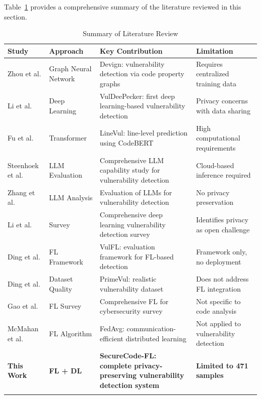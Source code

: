 \documentclass[pdflatex,sn-mathphys-num]{sn-jnl}
\theoremstyle{thmstyleone}%
\theoremstyle{thmstyletwo}%
\theoremstyle{thmstylethree}%
\begin{document}
Table~\ref{tab:literature} provides a comprehensive summary of the literature reviewed in this section.

\begin{table}[t]
\caption{Summary of Literature Review}\label{tab:literature}
\centering
\small
\begin{tabular}{@{}p{2.8cm}p{2.2cm}p{4.5cm}p{3.5cm}@{}}
\toprule
\textbf{Study} & \textbf{Approach} & \textbf{Key Contribution} & \textbf{Limitation} \\
\midrule
Zhou et al. \cite{zhou2019devign} & Graph Neural Network & Devign: vulnerability detection via code property graphs & Requires centralized training data \\
\addlinespace
Li et al. \cite{li2018vuldeepecker} & Deep Learning & VulDeePecker: first deep learning-based vulnerability detection & Privacy concerns with data sharing \\
\addlinespace
Fu et al. \cite{fu2022linevul} & Transformer & LineVul: line-level prediction using CodeBERT & High computational requirements \\
\addlinespace
Steenhoek et al. \cite{steenhoek2024comprehensive} & LLM Evaluation & Comprehensive LLM capability study for vulnerability detection & Cloud-based inference required \\
\addlinespace
Zhang et al. \cite{zhang2024llmvulndetect} & LLM Analysis & Evaluation of LLMs for vulnerability detection & No privacy preservation \\
\addlinespace
Li et al. \cite{li2024vuldetect} & Survey & Comprehensive deep learning vulnerability detection survey & Identifies privacy as open challenge \\
\addlinespace
Ding et al. \cite{ding2024vulfl} & FL Framework & VulFL: evaluation framework for FL-based detection & Framework only, no deployment \\
\addlinespace
Ding et al. \cite{ding2024primevul} & Dataset Quality & PrimeVul: realistic vulnerability dataset & Does not address FL integration \\
\addlinespace
Gao et al. \cite{gao2024federated} & FL Survey & Comprehensive FL for cybersecurity survey & Not specific to code analysis \\
\addlinespace
McMahan et al. \cite{mcmahan2017communication} & FL Algorithm & FedAvg: communication-efficient distributed learning & Not applied to vulnerability detection \\
\midrule
\textbf{This Work} & \textbf{FL + DL} & \textbf{SecureCode-FL: complete privacy-preserving vulnerability detection system} & \textbf{Limited to 471 samples} \\
\botrule
\end{tabular}
\end{table}
\end{document}
